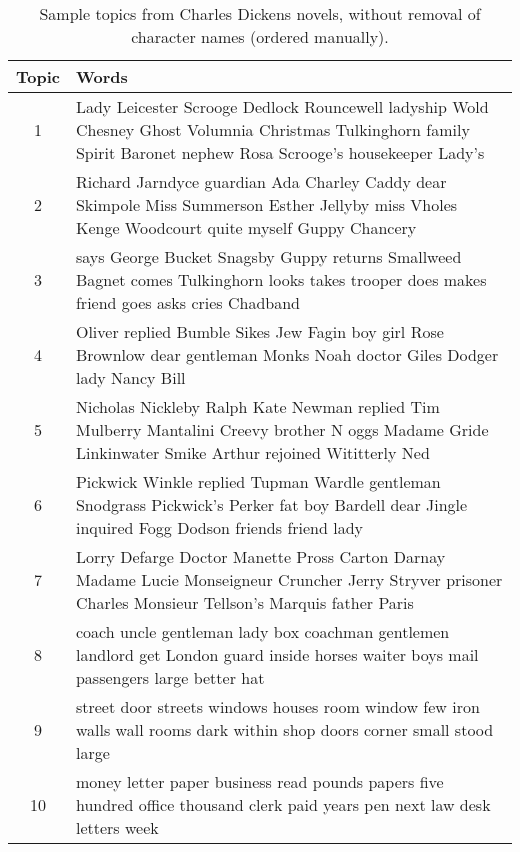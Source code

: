 \begin{table}[htp]
\caption{Sample topics from Charles Dickens novels, without removal of character names (ordered manually).}
\begin{center}
\begin{tabular}{cp{10cm}}
\rowcolor{gray!50}
Topic & Words \\
\hline
1 & Lady Leicester Scrooge Dedlock Rouncewell ladyship Wold
Chesney Ghost Volumnia Christmas Tulkinghorn
       family Spirit Baronet nephew Rosa Scrooge's housekeeper Lady's \\
2 & Richard Jarndyce guardian Ada Charley Caddy dear Skimpole Miss Summerson Esther Jellyby miss Vholes Kenge Woodcourt quite myself Guppy Chancery \\
3 & says George Bucket Snagsby Guppy returns Smallweed Bagnet comes Tulkinghorn looks takes trooper does makes friend goes asks cries Chadband \\
4 & Oliver replied Bumble Sikes Jew Fagin boy girl Rose Brownlow dear gentleman Monks Noah doctor Giles Dodger lady Nancy Bill \\
5& Nicholas Nickleby Ralph Kate Newman replied Tim Mulberry Mantalini Creevy brother N oggs Madame Gride Linkinwater Smike Arthur rejoined Wititterly Ned \\
6 & Pickwick Winkle replied Tupman Wardle gentleman Snodgrass Pickwick's Perker fat boy Bardell dear Jingle inquired Fogg Dodson friends friend lady  \\
7 &  Lorry Defarge Doctor Manette Pross Carton Darnay Madame Lucie Monseigneur Cruncher Jerry Stryver prisoner Charles Monsieur Tellson's Marquis father Paris \\
8 & coach uncle gentleman lady box coachman gentlemen landlord get London guard inside horses waiter boys mail passengers large better hat \\
9 & street door streets windows houses room window few iron walls wall rooms dark within shop doors corner small stood large  \\
10 & money letter paper business read pounds papers five hundred office thousand clerk paid years pen next law desk letters week \\
\end{tabular}
\end{center}
\label{tbl:dickens-with-names}
\end{table}%


